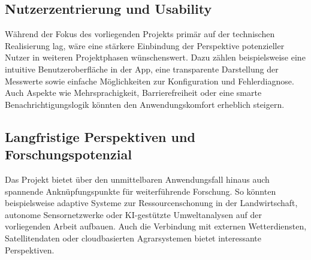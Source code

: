 \subsection*{Nutzerzentrierung und Usability}

Während der Fokus des vorliegenden Projekts primär auf der technischen Realisierung lag, wäre eine stärkere Einbindung der Perspektive potenzieller Nutzer in weiteren Projektphasen wünschenswert. Dazu zählen beispielsweise eine intuitive Benutzeroberfläche in der App, eine transparente Darstellung der Messwerte sowie einfache Möglichkeiten zur Konfiguration und Fehlerdiagnose. Auch Aspekte wie Mehrsprachigkeit, Barrierefreiheit oder eine smarte Benachrichtigungslogik könnten den Anwendungskomfort erheblich steigern.

\subsection*{Langfristige Perspektiven und Forschungspotenzial}

Das Projekt bietet über den unmittelbaren Anwendungsfall hinaus auch spannende Anknüpfungspunkte für weiterführende Forschung. So könnten beispielsweise adaptive Systeme zur Ressourcenschonung in der Landwirtschaft, autonome Sensornetzwerke oder KI-gestützte Umweltanalysen auf der vorliegenden Arbeit aufbauen. Auch die Verbindung mit externen Wetterdiensten, Satellitendaten oder cloudbasierten Agrarsystemen bietet interessante Perspektiven.

